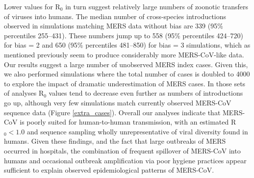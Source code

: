 \documentclass[11pt,oneside,letterpaper]{article}
\begin{document}
Lower values for R$_{0}$ in turn suggest relatively large numbers of zoonotic transfers of viruses into humans.
The median number of cross-species introductions observed in simulations matching MERS data without bias are 339 (95\% percentiles 255--431).
These numbers jump up to 558 (95\% percentiles 424--720) for bias = 2 and 650 (95\% percentiles 481--850) for bias = 3 simulations, which as mentioned previously seem to produce considerably more MERS-CoV-like data.
Our results suggest a large number of unobserved MERS index cases.
Given this, we also performed simulations where the total number of cases is doubled to 4000 to explore the impact of dramatic underestimation of MERS cases.
In those sets of analyses R$_{0}$ values tend to decrease even further as numbers of introductions go up, although very few simulations match currently observed MERS-CoV sequence data (Figure \ref{extra_cases}).
Overall our analyses indicate that MERS-CoV is poorly suited for human-to-human transmission, with an estimated R$_{0}<1.0$ and sequence sampling wholly unrepresentative of viral diversity found in humans.
Given these findings, and the fact that large outbreaks of MERS occurred in hospitals, the combination of frequent spillover of MERS-CoV into humans and occasional outbreak amplification via poor hygiene practices appear sufficient to explain observed epidemiological patterns of MERS-CoV.
\end{document}
